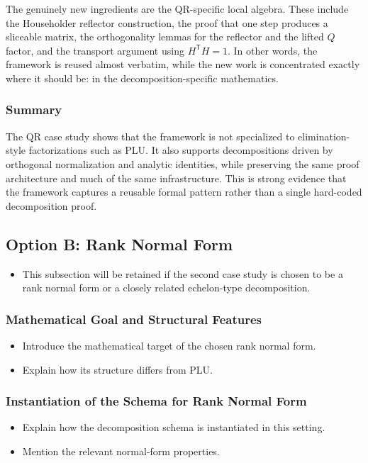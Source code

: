 \documentclass[pdflatex,sn-mathphys-num]{sn-jnl}%
\theoremstyle{thmstyleone}%
\theoremstyle{thmstyletwo}%
\theoremstyle{thmstylethree}%
\begin{document}
The genuinely new ingredients are the QR-specific local algebra.  These include the Householder reflector construction, the proof that one step produces a sliceable matrix, the orthogonality lemmas for the reflector and the lifted \(Q\) factor, and the transport argument using \(H^{\mathsf T}H=1\).  In other words, the framework is reused almost verbatim, while the new work is concentrated exactly where it should be: in the decomposition-specific mathematics.

\subsubsection{Summary}
The QR case study shows that the framework is not specialized to elimination-style factorizations such as PLU.  It also supports decompositions driven by orthogonal normalization and analytic identities, while preserving the same proof architecture and much of the same infrastructure.  This is strong evidence that the framework captures a reusable formal pattern rather than a single hard-coded decomposition proof.

\subsection{Option B: Rank Normal Form}
\begin{itemize}
  \item This subsection will be retained if the second case study is chosen to be a rank normal form or a closely related echelon-type decomposition.
\end{itemize}

\subsubsection{Mathematical Goal and Structural Features}%
\begin{itemize}
  \item Introduce the mathematical target of the chosen rank normal form.
  \item Explain how its structure differs from PLU.
\end{itemize}

\subsubsection{Instantiation of the Schema for Rank Normal Form}
\begin{itemize}
  \item Explain how the decomposition schema is instantiated in this setting.
  \item Mention the relevant normal-form properties.
\end{itemize}
\end{document}

